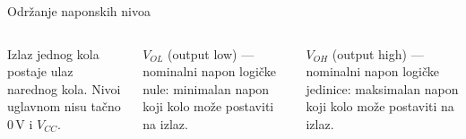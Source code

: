 \begin{frame}[label=08-s013]{Održanje naponskih nivoa}
\begin{columns}[c,onlytextwidth]
\centering
{}
Izlaz jednog kola postaje ulaz narednog kola. Nivoi uglavnom nisu tačno $0\,\mathrm V$ i $V_{CC}$.
\medskip\par
$V_{OL}$ (output low) — nominalni napon logičke nule: minimalan napon koji kolo može postaviti na izlaz.\par\medskip
$V_{OH}$ (output high) — nominalni napon logičke jedinice: maksimalan napon koji kolo može postaviti na izlaz.
\end{columns}\medskip\centering

\end{frame}
